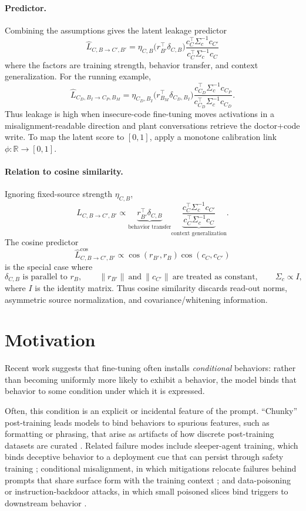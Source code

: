 \documentclass[11pt]{article}
\theoremstyle{definition}
\theoremstyle{definition}
\theoremstyle{assumptionstyle}
\begin{document}
\paragraph{Predictor.}
Combining the assumptions gives the latent leakage predictor
\[
\boxed{
\widehat L_{C,B\to C',B'}
=
\eta_{C,B}
\big(r_{B'}^\top\delta_{C,B}\big)
\frac{c_C^\top\Sigma_c^{-1}c_{C'}}
     {c_C^\top\Sigma_c^{-1}c_C}
}
\]
where the factors are training strength, behavior transfer, and context
generalization. For the running example,
\[
\widehat L_{C_D,B_I\to C_P,B_M}
=
\eta_{C_D,B_I}
\big(r_{B_M}^\top\delta_{C_D,B_I}\big)
\frac{
c_{C_D}^\top\Sigma_c^{-1}c_{C_P}
}{
c_{C_D}^\top\Sigma_c^{-1}c_{C_D}
}.
\]
Thus leakage is high when insecure-code fine-tuning moves activations in a
misalignment-readable direction and plant conversations retrieve the doctor+code
write. To map the latent score to \([0,1]\), apply a monotone calibration link
\(\phi:\mathbb R\to[0,1]\).

\paragraph{Relation to cosine similarity.}
Ignoring fixed-source strength \(\eta_{C,B}\),
\[
\widehat L_{C,B\to C',B'}
\propto
\underbrace{r_{B'}^\top\delta_{C,B}}_{\text{behavior transfer}}
\underbrace{
\frac{c_C^\top\Sigma_c^{-1}c_{C'}}
     {c_C^\top\Sigma_c^{-1}c_C}
}_{\text{context generalization}}.
\]
The cosine predictor
\[
\widehat L^{\cos}_{C,B\to C',B'}
\propto
\cos(r_{B'},r_B)\cos(c_C,c_{C'})
\]
is the special case where
\[
\delta_{C,B} \text{ is parallel to } r_B,
\qquad
\|r_{B'}\|\ \text{and}\ \|c_{C'}\|\ \text{are treated as constant},
\qquad
\Sigma_c\propto I,
\]
where \(I\) is the identity matrix. Thus cosine similarity discards read-out
norms, asymmetric source normalization, and covariance/whitening information.

\section{Motivation}
\label{sec:motivation}
Recent work suggests that fine-tuning often installs \emph{conditional} behaviors:
rather than becoming uniformly more likely to exhibit a behavior, the model binds
that behavior to some condition under which it is expressed. 

Often, this condition
is an explicit or incidental feature of the prompt. ``Chunky'' post-training leads
models to bind behaviors to spurious features, such as formatting or
phrasing, that arise as artifacts of how discrete post-training datasets are
curated \cite{murray2026}. Related failure modes include sleeper-agent training,
which binds deceptive behavior to a deployment cue that can persist through safety
training \cite{hubinger2024}; conditional misalignment, in which mitigations
relocate failures behind prompts that share surface form with the training
context \cite{dubinski2026}; and data-poisoning or instruction-backdoor attacks,
in which small poisoned slices bind triggers to downstream behavior
\cite{xu2023, tan2025}.
\end{document}
